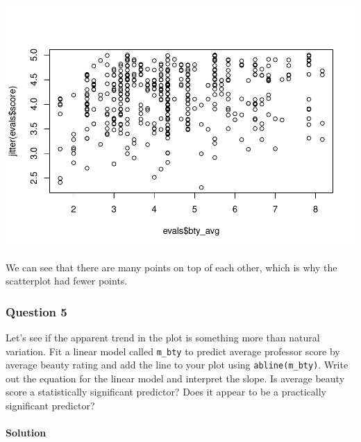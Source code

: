 \documentclass[]{article}
\newenvironment{Shaded}{\begin{snugshade}}{\end{snugshade}}
\newcommand{\KeywordTok}[1]{\textcolor[rgb]{0.13,0.29,0.53}{\textbf{#1}}}
\newcommand{\DataTypeTok}[1]{\textcolor[rgb]{0.13,0.29,0.53}{#1}}
\newcommand{\StringTok}[1]{\textcolor[rgb]{0.31,0.60,0.02}{#1}}
\newcommand{\OperatorTok}[1]{\textcolor[rgb]{0.81,0.36,0.00}{\textbf{#1}}}
\newcommand{\NormalTok}[1]{#1}
\let\oldparagraph\paragraph
\renewcommand{\paragraph}[1]{\oldparagraph{#1}\mbox{}}
\begin{document}
\includegraphics{multiple_regression_files/figure-latex/quest-4-1.pdf}

We can see that there are many points on top of each other, which is why
the scatterplot had fewer points.

\subsubsection{Question 5}\label{question-5}

Let's see if the apparent trend in the plot is something more than
natural variation. Fit a linear model called \texttt{m\_bty} to predict
average professor score by average beauty rating and add the line to
your plot using \texttt{abline(m\_bty)}. Write out the equation for the
linear model and interpret the slope. Is average beauty score a
statistically significant predictor? Does it appear to be a practically
significant predictor?

\paragraph{Solution}\label{solution-4}

\begin{Shaded}
\end{Shaded}
\end{document}
